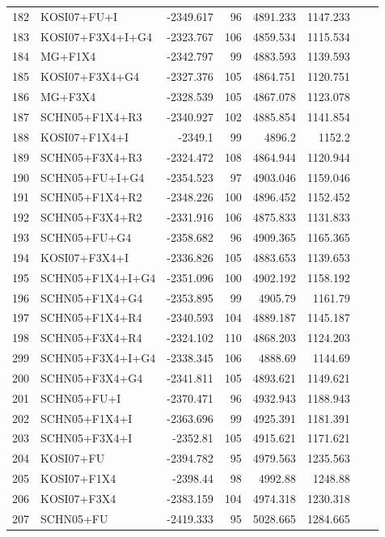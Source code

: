 \documentclass[12pt]{article}
\begin{document}
\begin{longtable}{clrrrrrr}
	182 & KOSI07+FU+I & -2349.617 & 96 & 4891.233 & 1147.233 \\ 
	183 & KOSI07+F3X4+I+G4 & -2323.767 & 106 & 4859.534 & 1115.534 \\ 
	184 & MG+F1X4 & -2342.797 & 99 & 4883.593 & 1139.593 & \\ 
	185 & KOSI07+F3X4+G4 & -2327.376 & 105 & 4864.751 & 1120.751 \\ 
	186 & MG+F3X4 & -2328.539 & 105 & 4867.078 & 1123.078 \\ 
	187 & SCHN05+F1X4+R3 & -2340.927 & 102 & 4885.854 & 1141.854 \\ 
	188 & KOSI07+F1X4+I & -2349.1 & 99 & 4896.2 & 1152.2 & \\ 
	189 & SCHN05+F3X4+R3 & -2324.472 & 108 & 4864.944 & 1120.944 \\ 
	190 & SCHN05+FU+I+G4 & -2354.523 & 97 & 4903.046 & 1159.046 \\ 
	191 & SCHN05+F1X4+R2 & -2348.226 & 100 & 4896.452 & 1152.452 \\ 
	192 & SCHN05+F3X4+R2 & -2331.916 & 106 & 4875.833 & 1131.833 \\ 
	193 & SCHN05+FU+G4 & -2358.682 & 96 & 4909.365 & 1165.365 \\ 
	194 & KOSI07+F3X4+I & -2336.826 & 105 & 4883.653 & 1139.653 \\ 
	195 & SCHN05+F1X4+I+G4 & -2351.096 & 100 & 4902.192 & 1158.192 \\ 
	196 & SCHN05+F1X4+G4 & -2353.895 & 99 & 4905.79 & 1161.79 \\ 
	197 & SCHN05+F1X4+R4 & -2340.593 & 104 & 4889.187 & 1145.187 \\ 
	198 & SCHN05+F3X4+R4 & -2324.102 & 110 & 4868.203 & 1124.203 \\ 
	299 & SCHN05+F3X4+I+G4 & -2338.345 & 106 & 4888.69 & 1144.69 \\ 
	200 & SCHN05+F3X4+G4 & -2341.811 & 105 & 4893.621 & 1149.621 \\ 
	201 & SCHN05+FU+I & -2370.471 & 96 & 4932.943 & 1188.943 \\ 
	202 & SCHN05+F1X4+I & -2363.696 & 99 & 4925.391 & 1181.391 \\ 
	203 & SCHN05+F3X4+I & -2352.81 & 105 & 4915.621 & 1171.621 \\ 
	204 & KOSI07+FU & -2394.782 & 95 & 4979.563 & 1235.563 \\ 
	205 & KOSI07+F1X4 & -2398.44 & 98 & 4992.88 & 1248.88 \\ 
	206 & KOSI07+F3X4 & -2383.159 & 104 & 4974.318 & 1230.318 \\ 
	207 & SCHN05+FU & -2419.333 & 95 & 5028.665 & 1284.665 \\ 

\end{longtable}
\end{document}
